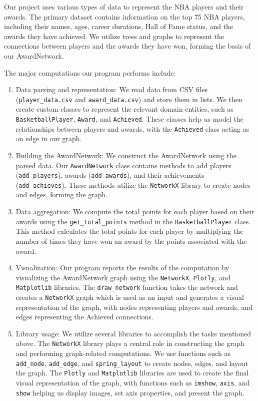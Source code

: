 \documentclass[fontsize=11pt]{article}
\begin{document}
\hspace{\parindent{}} Our project uses various types of data to represent the NBA players and their awards. The primary dataset contains information on the top 75 NBA players, including their names, ages, career durations, Hall of Fame status, and the awards they have achieved. We utilize trees and graphs to represent the connections between players and the awards they have won, forming the basis of our AwardNetwork.

The major computations our program performs include:

\begin{enumerate}
    \item Data parsing and representation: We read data from CSV files (\texttt{player\_data.csv} and \texttt{award\_data.csv}) and store them in lists. We then create custom classes to represent the relevant domain entities, such as \texttt{BasketballPlayer}, \texttt{Award}, and \texttt{Achieved}. These classes help us model the relationships between players and awards, with the \texttt{Achieved} class acting as an edge in our graph.
    
    \item Building the AwardNetwork: We construct the AwardNetwork using the parsed data. Our \texttt{AwardNetwork} class contains methods to add players (\texttt{add\_players}), awards (\texttt{add\_awards}), and their achievements (\texttt{add\_achieves}). These methods utilize the \texttt{NetworkX} library to create nodes and edges, forming the graph.
    
    \item Data aggregation: We compute the total points for each player based on their awards using the \texttt{get\_total\_points} method in the \texttt{BasketballPlayer} class. This method calculates the total points for each player by multiplying the number of times they have won an award by the points associated with the award.
    
    \item Visualization: Our program reports the results of the computation by visualizing the AwardNetwork graph using the \texttt{NetworkX}, \texttt{Plotly}, and \texttt{Matplotlib} libraries. The \texttt{draw\_network} function takes the network and creates a \texttt{NetworkX} graph which is used as an input and generates a visual representation of the graph, with nodes representing players and awards, and edges representing the Achieved connections.
    
    \item Library usage: We utilize several libraries to accomplish the tasks mentioned above. The \texttt{NetworkX} library plays a central role in constructing the graph and performing graph-related computations. We use functions such as \texttt{add\_node}, \texttt{add\_edge}, and \texttt{spring\_layout} to create nodes, edges, and layout the graph. The \texttt{Plotly} and \texttt{Matplotlib} libraries are used to create the final visual representation of the graph, with functions such as \texttt{imshow}, \texttt{axis}, and \texttt{show} helping us display images, set axis properties, and present the graph.
\end{enumerate}
\end{document}

